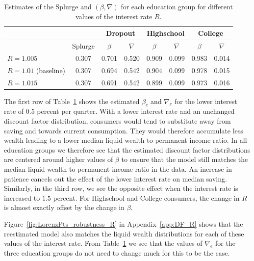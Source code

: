\documentclass[../HAFiscal]{subfiles}
\begin{document}
\begin{table}[t]
\begin{center}
	\begin{tabular}{lc|cccccc} 
		\toprule
		& & \multicolumn{2}{c}{Dropout} & \multicolumn{2}{c}{Highschool} & \multicolumn{2}{c}{College} \\ \midrule 
		& Splurge & $\beta$ & $\nabla$ & $\beta$ & $\nabla$ & $\beta$ & $\nabla$ \\ \midrule 
		$R = 1.005$ & 0.307 & 0.701 & 0.520 & 0.909 & 0.099 & 0.983 & 0.014 \\
		$R = 1.01$ (baseline) & 0.307 & 0.694 & 0.542 & 0.904 & 0.099 & 0.978 & 0.015 \\ 
		$R = 1.015$ & 0.307 & 0.691 & 0.542 & 0.899 & 0.099 & 0.973 & 0.016 
		\\ \bottomrule 
	\end{tabular}
\end{center}
\caption{Estimates of the Splurge and $(\beta,\nabla)$ for each education group for different values of the interest rate $R$.}
\label{tab:robustness_R}
\end{table}

The first row of Table~\ref{tab:robustness_R} shows the estimated $\beta_e$ and $\nabla_e$ for the lower interest rate of $0.5$ percent per quarter. With a lower interest rate and an unchanged discount factor distribution, consumers would tend to substitute away from saving and towards current consumption. They would therefore accumulate less wealth leading to a lower median liquid wealth to permanent income ratio. In all education groups we therefore see that the estimated discount factor distributions are centered around higher values of $\beta$ to ensure that the model still matches the median liquid wealth to permanent income ratio in the data. An increase in patience cancels out the effect of the lower interest rate on median saving. Similarly, in the third row, we see the opposite effect when the interest rate is increased to $1.5$ percent. For Highschool and College consumers, the change in $R$ is almost exactly offset by the change in $\beta$.  

Figure~\ref{fig:LorenzPts_robustness_R} in Appendix~\ref{app:DF_R} shows that the reestimated model also matches the liquid wealth distributions for each of these values of the interest rate. From Table~\ref{tab:robustness_R} we see that the values of $\nabla_e$ for the three education groups do not need to change much for this to be the case. 

\FloatBarrier
\end{document}
